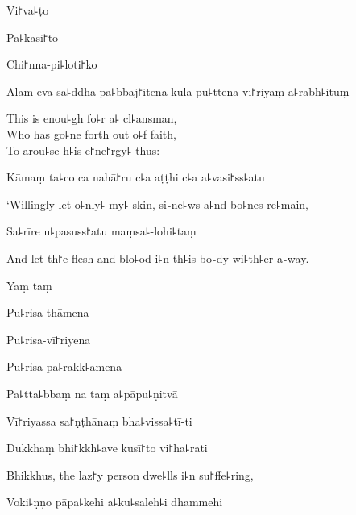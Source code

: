 Vi꜓va꜕ṭo


Pa꜕kāsi꜓to


Chi꜓nna-pi꜕loti꜓ko


Alam-eva sa꜕ddhā-pa꜕bbaj꜓itena kula-pu꜕ttena vī꜓riyaṃ ā꜕rabh꜕ituṃ

\begin{english}
  This is enou꜕gh fo꜕r a꜕ cl꜕ansman,\\
  Who has go꜕ne forth out o꜕f faith,\\
  To arou꜕se h꜕is e꜓ne꜓rgy꜕ thus:
\end{english}

Kāmaṃ ta꜕co ca nahā꜓ru c꜕a aṭṭhi c꜕a a꜕vasi꜓ss꜕atu

\begin{english}
  `Willingly let o꜕nly꜕ my꜕ skin, si꜕ne꜕ws a꜕nd bo꜕nes re꜕main,
\end{english}

Sa꜕rīre u꜕pasuss꜓atu maṃsa꜕-lohi꜕taṃ

\begin{english}
  And let th꜓e flesh and blo꜕od i꜕n th꜕is bo꜕dy wi꜕th꜕er a꜕way.
\end{english}

Yaṃ taṃ


Pu꜕risa-thāmena


Pu꜕risa-vī꜓riyena


Pu꜕risa-pa꜕rakk꜕amena


Pa꜕tta꜕bbaṃ na taṃ a꜕pāpu꜕ṇitvā


Vī꜓riyassa sa꜓ṇṭhānaṃ bha꜕vissa꜕tī-ti


Dukkhaṃ bhi꜓kkh꜕ave kusī꜓to vi꜓ha꜕rati

\begin{english}
  Bhikkhus, the laz꜓y person dwe꜕lls i꜕n su꜓ffe꜕ring,
\end{english}

Voki꜕ṇṇo pāpa꜕kehi a꜕ku꜕saleh꜕i dhammehi

